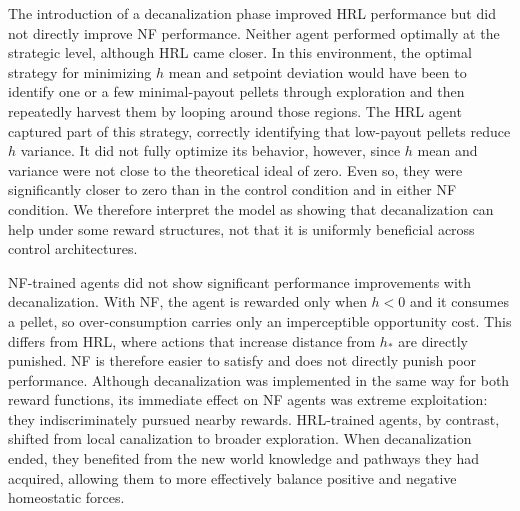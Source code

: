 \documentclass[12pt,fleqn]{article}
\begin{document}
The introduction of a decanalization phase improved HRL performance but did not directly improve NF performance. Neither agent performed optimally at the strategic level, although HRL came closer. In this environment, the optimal strategy for minimizing \(h\) mean and setpoint deviation would have been to identify one or a few minimal-payout pellets through exploration and then repeatedly harvest them by looping around those regions. The HRL agent captured part of this strategy, correctly identifying that low-payout pellets reduce \(h\) variance. It did not fully optimize its behavior, however, since \(h\) mean and variance were not close to the theoretical ideal of zero. Even so, they were significantly closer to zero than in the control condition and in either NF condition. We therefore interpret the model as showing that decanalization can help under some reward structures, not that it is uniformly beneficial across control architectures.

NF-trained agents did not show significant performance improvements with decanalization. With NF, the agent is rewarded only when \(h < 0\) and it consumes a pellet, so over-consumption carries only an imperceptible opportunity cost. This differs from HRL, where actions that increase distance from \(h_*\) are directly punished. NF is therefore easier to satisfy and does not directly punish poor performance. Although decanalization was implemented in the same way for both reward functions, its immediate effect on NF agents was extreme exploitation: they indiscriminately pursued nearby rewards. HRL-trained agents, by contrast, shifted from local canalization to broader exploration. When decanalization ended, they benefited from the new world knowledge and pathways they had acquired, allowing them to more effectively balance positive and negative homeostatic forces.
\end{document}
